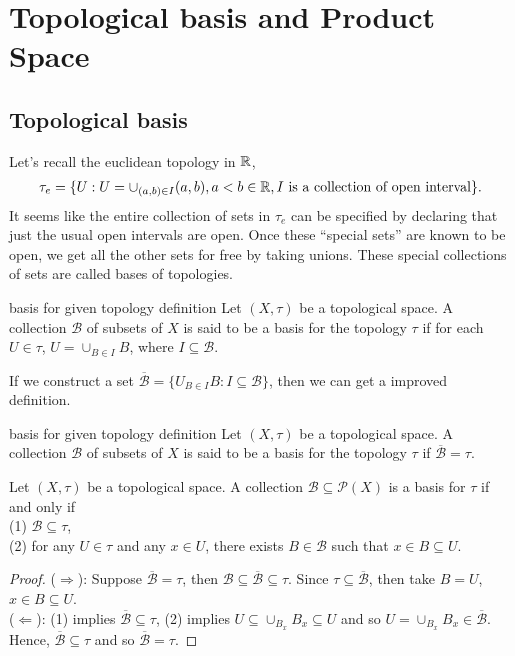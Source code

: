 \newcommand{\ob}{\overline{\mathcal{B}}}
\chapter{Topological basis and Product Space}\label{chp:1_3}


\section{Topological basis}
Let's recall the euclidean topology in $\mathbb{R}$, 
\begin{align*}
    \tau_e = \{U : U=\cup_{(a,b)\in I} (a,b), a<b\in \mathbb{R}, I \text{ is a collection of open interval}\}.
\end{align*}
It seems like the entire collection of sets
in $\tau_e$ can be specified by declaring that just the usual open intervals are open. Once these
“special sets” are known to be open, we get all the other sets for free by taking unions.
These special collections of sets are called bases of topologies.

\begin{definition}{}{basis for given topology definition}
    Let $(X,\tau)$ be a topological space. 
    A collection $\mathcal{B}$ of subsets of $X$ is said to be a basis for the topology $\tau$
    if for each $U\in \tau$, $U=\cup_{B\in I} B$, where $I\subseteq \mathcal{B}$.
\end{definition}

If we construct a set $\ob=\{U_{B\in I}B: I \subseteq \mathcal{B}\}$, 
then we can get a improved definition. 

\begin{definition}{}{basis for given topology definition}
    Let $(X,\tau)$ be a topological space. 
    A collection $\mathcal{B}$ of subsets of $X$ is said to be a basis for the topology $\tau$
    if $\ob=\tau$.
\end{definition}

\begin{proposition}{}{}
    Let $(X, \tau)$ be a topological space.
     A collection $\mathcal{B} \subseteq \mathcal{P}(X)$ is a
basis for $\tau$ if and only if\\
(1) $\mathcal{B} \subseteq \tau$,\\
(2) for any $U \in \tau$ and any $x \in U$, there exists $B \in \mathcal{B}$ such that $x \in B \subseteq U$.
\end{proposition}

\begin{proof}
    ($\Rightarrow$): Suppose $\ob=\tau$, then $\mathcal{B}\subseteq \ob\subseteq \tau$. 
    Since $\tau\subseteq \ob$, then take $B=U$, $x\in B\subseteq U$.
    \\
    ($\Leftarrow$): (1) implies $\ob\subseteq \tau$, 
    (2) implies $U\subseteq \cup_{B_x}B_x\subseteq U$ and so $U=\cup_{B_x}B_x\in \ob$. 
    Hence, $\ob\subseteq \tau$ and so $\ob=\tau$.
\end{proof}

